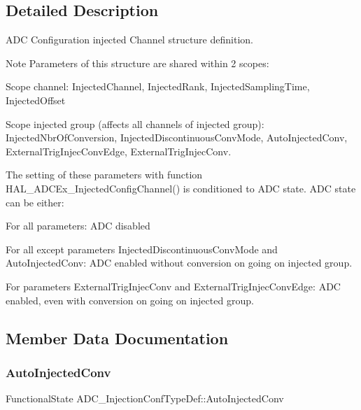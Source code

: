 \subsection{Detailed Description}
A\+DC Configuration injected Channel structure definition. 

\begin{DoxyNote}{Note}
Parameters of this structure are shared within 2 scopes\+:
\begin{DoxyItemize}
\item Scope channel\+: Injected\+Channel, Injected\+Rank, Injected\+Sampling\+Time, Injected\+Offset
\item Scope injected group (affects all channels of injected group)\+: Injected\+Nbr\+Of\+Conversion, Injected\+Discontinuous\+Conv\+Mode, Auto\+Injected\+Conv, External\+Trig\+Injec\+Conv\+Edge, External\+Trig\+Injec\+Conv. 
\end{DoxyItemize}

The setting of these parameters with function H\+A\+L\+\_\+\+A\+D\+C\+Ex\+\_\+\+Injected\+Config\+Channel() is conditioned to A\+DC state. A\+DC state can be either\+:
\begin{DoxyItemize}
\item For all parameters\+: A\+DC disabled
\item For all except parameters \textquotesingle{}Injected\+Discontinuous\+Conv\+Mode\textquotesingle{} and \textquotesingle{}Auto\+Injected\+Conv\textquotesingle{}\+: A\+DC enabled without conversion on going on injected group.
\item For parameters \textquotesingle{}External\+Trig\+Injec\+Conv\textquotesingle{} and \textquotesingle{}External\+Trig\+Injec\+Conv\+Edge\textquotesingle{}\+: A\+DC enabled, even with conversion on going on injected group. 
\end{DoxyItemize}
\end{DoxyNote}


\subsection{Member Data Documentation}
\mbox{\label{struct_a_d_c___injection_conf_type_def_a39b2ddf75be46eb2d474e261e7b1c875}} 
\subsubsection{\texorpdfstring{AutoInjectedConv}{AutoInjectedConv}}
{\footnotesize\ttfamily Functional\+State A\+D\+C\+\_\+\+Injection\+Conf\+Type\+Def\+::\+Auto\+Injected\+Conv}

